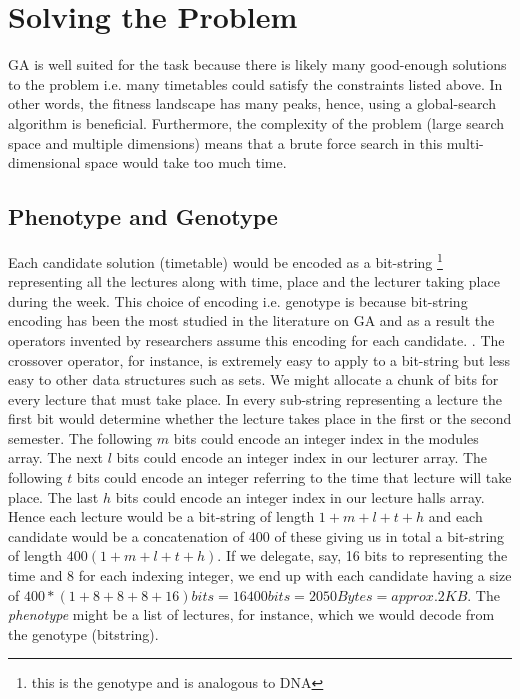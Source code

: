 \documentclass[a4paper, 12pt, titlepage]{article}
\begin{document}

\section*{Solving the Problem}

GA is well suited for the task because there is likely many good-enough
solutions to the problem i.e. many timetables could satisfy the
constraints listed above. In other words, the fitness landscape has
many peaks, hence, using a global-search algorithm is beneficial.
Furthermore, the complexity of the problem (large search
space and multiple dimensions) means that a brute force search in this
multi-dimensional space would take too much time.

\subsection*{Phenotype and Genotype}

Each candidate solution (timetable) would be encoded as a bit-string
\footnote{this is the genotype and is analogous to DNA} representing all
the lectures along with time, place and the lecturer taking place during
the week.  This choice of encoding i.e. genotype is because bit-string
encoding has been the most studied in the literature on GA and as a
result the operators invented by researchers assume this encoding for
each candidate. \cite[p.~103]{eberhart2007}. The crossover operator,
for instance, is extremely easy to apply to a bit-string but less easy
to other data structures such as sets. We might allocate a chunk of bits
for every lecture that must take place.  In every sub-string representing
a lecture the first bit would determine whether the lecture takes place
in the first or the second semester.  The following \(m\) bits could
encode an integer index in the modules array.  The next \(l\) bits could
encode an integer index in our lecturer array. The following \(t\) bits
could encode an integer referring to the time that lecture will take
place. The last \(h\) bits could encode an integer index in our lecture
halls array. Hence each lecture would be a bit-string of length \(1 +
m + l + t + h\) and each candidate would be a concatenation of \(400\)
of these giving us in total a bit-string of length \(400(1 + m + l + t +
h)\). If we delegate, say, 16 bits to representing the time and 8 for each
indexing integer, we end up with each candidate having a size of \(400 *
(1 + 8 + 8 + 8 + 16) bits = 16400 bits = 2050 Bytes = approx. 2KB \).
The \emph{phenotype} might be a list of lectures, for instance, which
we would decode from the genotype (bitstring).
\end{document}

